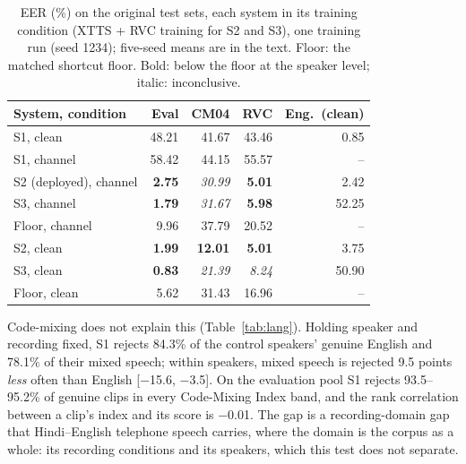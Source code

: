 \documentclass[conference]{IEEEtran}
\begin{document}
\begin{table}[t]
\centering
\caption{EER (\%) on the original test sets, each system in its training condition
(XTTS + RVC training for S2 and S3), one training run (seed 1234); five-seed means are in
the text. Floor: the matched shortcut floor. Bold: below the floor at the speaker level;
italic: inconclusive.}
\label{tab:main}
\small
\setlength{\tabcolsep}{4pt}
\begin{tabular}{@{}lrrrr@{}}
\toprule
System, condition & Eval & CM04 & RVC & Eng.\ (clean) \\
\midrule
S1, clean              & 48.21 & 41.67 & 43.46 & 0.85 \\
S1, channel            & 58.42 & 44.15 & 55.57 & -- \\
\midrule
S2 (deployed), channel & \textbf{2.75} & \textit{30.99} & \textbf{5.01} & 2.42 \\
S3, channel            & \textbf{1.79} & \textit{31.67} & \textbf{5.98} & 52.25 \\
Floor, channel         & 9.96 & 37.79 & 20.52 & -- \\
\midrule
S2, clean              & \textbf{1.99} & \textbf{12.01} & \textbf{5.01} & 3.75 \\
S3, clean              & \textbf{0.83} & \textit{21.39} & \textit{8.24} & 50.90 \\
Floor, clean           & 5.62 & 31.43 & 16.96 & -- \\
\bottomrule
\end{tabular}
\end{table}

Code-mixing does not explain this (Table~\ref{tab:lang}). Holding speaker and recording
fixed, S1 rejects 84.3\% of the control speakers' genuine English and 78.1\% of their
mixed speech; within speakers, mixed speech is rejected 9.5 points \emph{less} often than
English [$-$15.6, $-$3.5]. On the evaluation pool S1 rejects 93.5--95.2\% of genuine clips
in every Code-Mixing Index band, and the rank correlation between a clip's index and its
score is $-$0.01. The gap is a recording-domain gap that
Hindi--English telephone speech carries, where the domain is the corpus as a whole: its
recording conditions and its speakers, which this test does not separate.
\end{document}
